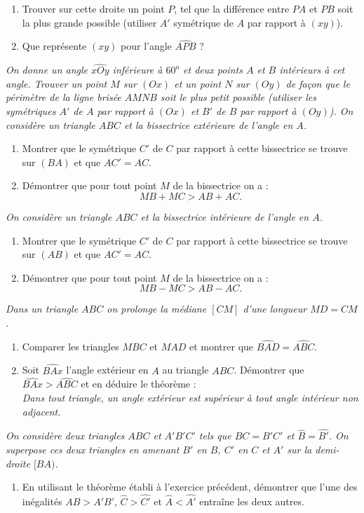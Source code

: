 \begin{itemize}
\begin{enumerate}
\item Trouver sur cette droite un point $P$, tel que la différence entre $PA$ et $PB$ soit la plus grande possible (utiliser $A'$ symétrique de $A$ par rapport à $(xy)$). 
\item Que représente $(xy)$ pour l'angle $\widehat{APB}$ ?
\end{enumerate}
\it On donne un angle $\widehat{xOy}$ inférieure à $60^o$ et deux points $A$ et $B$ intérieurs à cet angle. Trouver un point $M$ sur $(Ox)$ et un point $N$ sur $(Oy)$ de façon que le périmètre de la ligne brisée $AMNB$ soit le plus petit possible (utiliser les symétriques $A'$ de $A$ par rapport à $(Ox)$ et $B'$ de $B$ par rapport à $(Oy)$).
\it On considère un triangle $ABC$ et la bissectrice extérieure de l'angle en $A$. \begin{enumerate}
\item Montrer que le symétrique $C'$ de $C$ par rapport à cette bissectrice se trouve sur $(BA)$ et que $AC'=AC$. 
\item Démontrer que pour tout point $M$ de la bissectrice on a : \[ MB+MC>AB+AC.\]
\end{enumerate}
\it On considère un triangle $ABC$ et la bissectrice intérieure de l'angle en $A$. \begin{enumerate}
\item Montrer que le symétrique $C'$ de $C$ par rapport à cette bissectrice se trouve sur $(AB)$ et que $AC'=AC$. 
\item Démontrer que pour tout point $M$ de la bissectrice on a : \[ MB-MC>AB-AC.\]
\end{enumerate}
\it Dans un triangle $ABC$ on prolonge la médiane $[CM]$ d'une longueur $MD=CM$. \begin{enumerate}
\item Comparer les triangles $MBC$ et $MAD$ et montrer que $\widehat{BAD}=\widehat{ABC}$.
\item Soit $\widehat{BAx}$ l'angle extérieur en $A$ au
triangle $ABC$. Démontrer que $\widehat{BAx}>\widehat{ABC}$ et en déduire le théorème : \\
\emph{Dans tout triangle, un angle extérieur est supérieur à tout angle intérieur non adjacent.}
\end{enumerate} 
\it On considère deux triangles $ABC$ et $A'B'C'$ tels 
que $BC=B'C'$ et $\widehat{B}=\widehat{B'}$. On superpose ces deux triangles en amenant $B'$ en $B$, $C'$ en $C$ et $A'$ sur la demi-droite $[BA)$.\begin{enumerate}
\item En utilisant le théorème établi à l'exercice précédent, démontrer que l'une des inégalités $AB>A'B'$, $\widehat{C}>\widehat{C'}$ et $\widehat{A}<\widehat{A'}$ entraîne les deux autres.

\end{enumerate}
\end{itemize}
